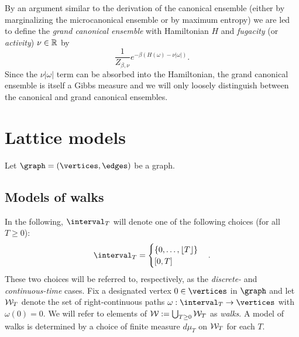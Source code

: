 By an argument similar to the derivation of the canonical ensemble (either by marginalizing
the microcanonical ensemble or by maximum entropy) we are led to define the \emph{grand
canonical ensemble} with Hamiltonian $H$ and \emph{fugacity} (or \emph{activity}) $\nu \in {\mathbb R}$ by
\begin{equation}
\frac{1}{Z_{\beta,\nu}} e^{-\beta (H(\omega) - \nu |\omega|)}.
\end{equation}
Since the $\nu |\omega|$ term can be absorbed into the Hamiltonian,
the grand canonical ensemble is itself a Gibbs measure and we will only loosely
distinguish between the canonical and grand canonical ensembles. 


\section{Lattice models}

Let $\graph = (\vertices, \edges)$ be a graph.



\subsection{Models of walks}

In the following, $\interval_T$ will denote one of the following choices (for all $T \ge 0$):
\begin{equation}
\interval_T
  =
\begin{cases}
\{ 0, \ldots, \lfloor T \rfloor \} \\
[0, T]
\end{cases}.
\end{equation}
These two choices will be referred to, respectively, as the \emph{discrete-} and
\emph{continuous-time} cases.
Fix a designated vertex $0 \in \vertices$ in $\graph$ and
let $\mathcal{W}_T$ denote the set of
right-continuous paths $\omega : \interval_T \to \vertices$ with $\omega(0) = 0$.
We will refer to elements of $\mathcal{W} := \bigcup_{T \geq 0} \mathcal{W}_T$ as \emph{walks}.
A model of walks is determined by a choice of finite measure $d\mu_T$ on
$\mathcal{W}_T$ for each $T$.

